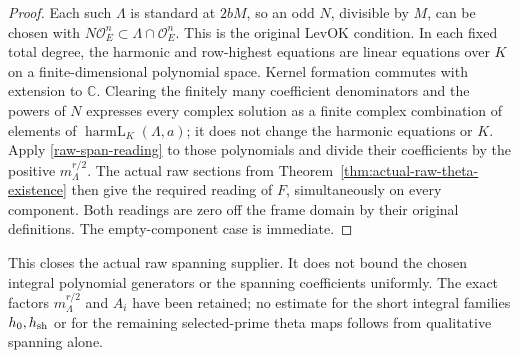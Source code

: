 \begin{proof}
Each such $\Lambda$ is standard at $2bM$, so an odd $N$,
divisible by $M$, can be chosen with
$N\mathcal O_E^n\subset\Lambda\cap\mathcal O_E^n$.
This is the original $\mathrm{LevOK}$ condition. In each
fixed total degree, the harmonic and row-highest equations
are linear equations over $K$ on a finite-dimensional
polynomial space. Kernel formation commutes with extension
to $\mathbb C$. Clearing the finitely many coefficient
denominators and the powers of $N$ expresses every complex
solution as a finite complex combination of elements of
$\operatorname{harmL}_K(\Lambda,a)$; it does not change
the harmonic equations or $K$.
Apply \eqref{raw-span-reading} to those polynomials and
divide their coefficients by the positive
$m_\Lambda^{r/2}$. The actual raw sections from
Theorem~\ref{thm:actual-raw-theta-existence} then give the
required reading of $F$, simultaneously on every component.
Both readings are zero off the frame domain by their original
definitions. The empty-component case is immediate.
\end{proof}

This closes the actual raw spanning supplier. It does not bound
the chosen integral polynomial generators or the spanning
coefficients uniformly. The exact factors
$m_\Lambda^{r/2}$ and $A_i$ have been retained; no estimate
for the short integral families $h_0,h_{\rm sh}$ or for the
remaining selected-prime theta maps follows from qualitative
spanning alone.
